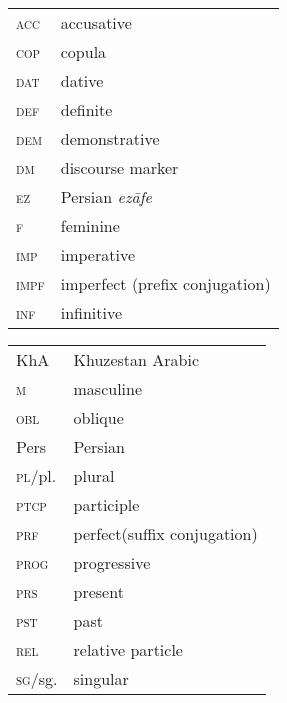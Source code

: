 \documentclass[output=paper,nonflat]{langsci/langscibook}
\begin{document}
\begin{tabularx}{.5\textwidth}{@{}lQ@{}}
\textsc{acc} & accusative\\
\textsc{cop} & copula\\
\textsc{dat} & dative\\
\textsc{def} & definite\\
\textsc{dem} & demonstrative\\
\textsc{dm} & discourse marker\\
\textsc{ez} & Persian \textit{ezāfe}\\
\textsc{f} & feminine\\
\textsc{imp} & imperative\\
\textsc{impf} & imperfect (prefix conjugation)\\
\textsc{inf} & infinitive\\
\end{tabularx}%
\begin{tabularx}{.5\textwidth}{@{}lQ@{}}
KhA & Khuzestan Arabic\\
\textsc{m} & masculine\\
\textsc{obl} & oblique\\
Pers & Persian\\
\textsc{pl}/pl. & plural\\
\textsc{ptcp} & participle\\
\textsc{prf} & perfect(suffix conjugation)\\
\textsc{prog} & progressive\\
\textsc{prs} & present\\
\textsc{pst} & past\\
\textsc{rel} & relative particle\\
\textsc{sg}/sg. & singular\\
\end{tabularx}%




\sloppy\printbibliography[heading=subbibliography,notkeyword=this]
\end{document}
